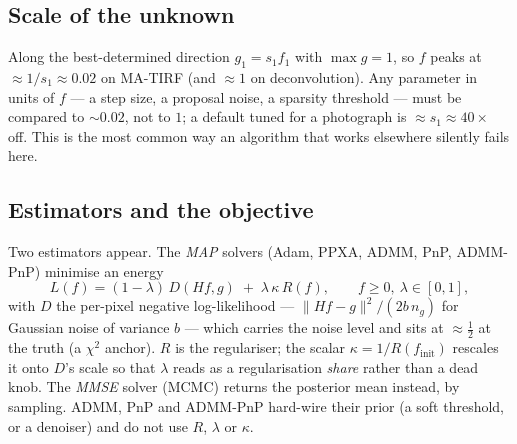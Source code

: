 \subsection{Scale of the unknown}
Along the best-determined direction $g_1 = s_1 f_1$ with $\max g = 1$, so $f$ peaks at
$\approx 1/s_1 \approx 0.02$ on MA-TIRF (and $\approx 1$ on deconvolution). Any parameter in
units of $f$ --- a step size, a proposal noise, a sparsity threshold --- must be compared to
${\sim}0.02$, not to $1$; a default tuned for a photograph is $\approx s_1 \approx 40\times$ off.
This is the most common way an algorithm that works elsewhere silently fails here.

\subsection{Estimators and the objective}
Two estimators appear. The \emph{MAP} solvers (Adam, PPXA, ADMM, PnP, ADMM-PnP) minimise an
energy
\begin{equation}
L(f) = (1-\lambda)\, D(Hf, g) \;+\; \lambda\,\kappa\, R(f), \qquad f \ge 0,\ \lambda \in [0,1],
\label{eq:objective}
\end{equation}
with $D$ the per-pixel negative log-likelihood --- $\|Hf-g\|^2/(2 b\, n_g)$ for Gaussian noise
of variance $b$ --- which carries the noise level and sits at $\approx \tfrac12$ at the truth
(a $\chi^2$ anchor). $R$ is the regulariser; the scalar $\kappa = 1/R(f_{\text{init}})$ rescales
it onto $D$'s scale so that $\lambda$ reads as a regularisation \emph{share} rather than a dead
knob. The \emph{MMSE} solver (MCMC) returns the posterior mean instead, by sampling. ADMM, PnP
and ADMM-PnP hard-wire their prior (a soft threshold, or a denoiser) and do not use
$R$, $\lambda$ or $\kappa$.
